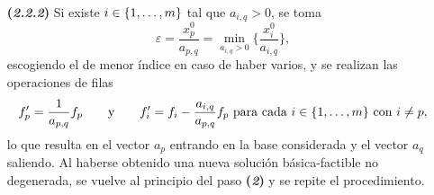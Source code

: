 \documentclass[11pt]{report}
\theoremstyle{mytheorem}
\theoremstyle{mydefinition}
\theoremstyle{myexample}
\begin{document}
\begin{itemize}
\begin{itemize}
\begin{itemize}
            \item[\textbf{(\textit{2.2.2})}]Si existe $i \in \{1,\mathellipsis,m\}$ tal que $a_{i,q} > 0$, se toma
            \[\varepsilon = \frac{x^0_p}{a_{p,q}} = \min_{a_{i,q}>0} \biggl\{\frac{x^0_i}{a_{i,q}}\biggr\},\]
            escogiendo el de menor índice en caso de haber varios, y se realizan las operaciones de filas
            \[f_p' = \frac{1}{a_{p,q}}f_p \qquad \textup{y} \qquad f_i' = f_i -\frac{a_{i,q}}{a_{p,q}}f_p \textup{ para cada } i \in \{1,\mathellipsis,m\} \textup{ con } i \neq p,\]
            lo que resulta en el vector $a_p$ entrando en la base considerada y el vector $a_q$ saliendo. Al haberse obtenido una nueva solución básica-factible no degenerada, se vuelve al principio del paso \textbf{(\textit{2})} y se repite el procedimiento.
        \end{itemize}
    \end{itemize}
\end{itemize}
\end{document}
